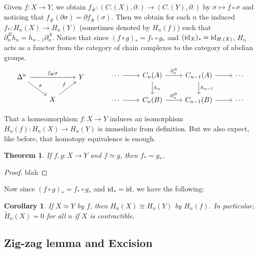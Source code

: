 \documentclass[11pt]{article}
\theoremstyle{definition}
\theoremstyle{plain}
\newtheorem*{corollary}{Corollary}
\newtheorem{theorem}{Theorem}[section]
\theoremstyle{remark}
\newcommand{\id}{\textup{id}}
\begin{document}
Given $f:X\to Y$, we obtain $f_\#:(C.(X),\partial.)\to(C.(Y),\partial.)$ by $\sigma\mapsto f\circ\sigma$ and noticing that $f_\#(\partial\sigma)=\partial f_\#(\sigma)$. Then we obtain for each $n$ the induced $f_\ast:H_n(X)\to H_n(Y)$ (sometimes denoted by $H_n(f)$) such that $\partial_n^Bh_n=h_{n-1}\partial_n^A$. Notice that since $(f\circ g)_\ast=f_\ast\circ g_\ast$ and $(\id_X)_\ast=\id_{H.(X)}$, $H_n$ acts as a functor from the category of chain complexes to the category of abelian groups.
\[\begin{tikzcd}
\Delta^n\arrow{dr}{\sigma}\arrow{rr}{f_\#\sigma}&&Y\\
&X\arrow{ur}{f}
\end{tikzcd}\quad\quad\quad\begin{tikzcd}
\cdots\arrow{r}&C_n(A)\arrow{d}{h_n}\arrow{r}{\partial_n^A}&C_{n-1}(A)\arrow{d}{h_{n-1}}\arrow{r}&\cdots\\
\cdots\arrow{r}&C_n(B)\arrow{r}{\partial_n^B}&C_{n-1}(B)\arrow{r}&\cdots
\end{tikzcd}\]

That a homeomorphism $f:X\to Y$ induces an isomorphism $H_n(f):H_n(X)\to H_n(Y)$ is immediate from definition. But we also expect, like before, that homotopy equivalence is enough.\medbreak

\begin{theorem}
If $f,g:X\to Y$ and $f\simeq g$, then $f_\ast=g_\ast$.
\end{theorem}
\begin{proof}
blah
\end{proof}

Now since $(f\circ g)_\ast=f_\ast\circ g_\ast$ and $\id_\ast=\id$, we have the following:

\begin{corollary}
If $X\simeq Y$ by $f$, then $H_n(X)\cong H_n(Y)$ by $H_n(f)$. In particular,     $\widetilde{H}_n(X)=0$ for all $n$ if $X$ is contractible.
\end{corollary}

\subsection{Zig-zag lemma and Excision}\label{12}
\end{document}
